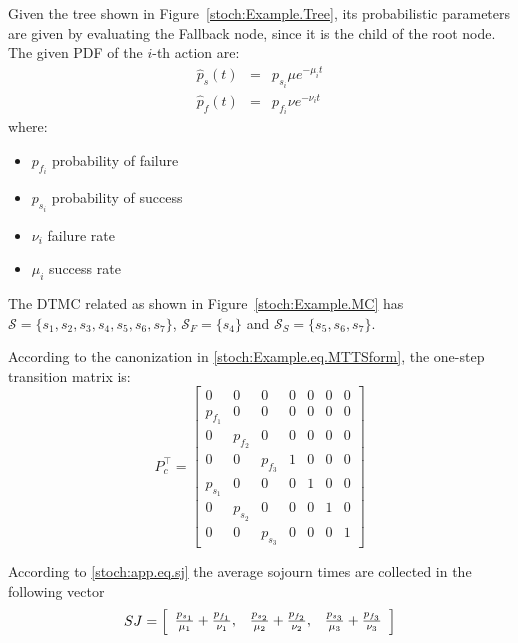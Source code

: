 \begin{example}
Given the tree shown in Figure~\ref{stoch:Example.Tree}, its probabilistic parameters are given by evaluating the Fallback node, since it is the child of the root node. The given PDF of the $i$-th action are:
\begin{eqnarray}
 \hat p_s(t)&=& p_{s_i} \mu e^{-\mu_i t}\\
  \hat p_f(t)&=& p_{f_i} \nu e^{-\nu_i t}
\end{eqnarray}
where:
\begin{itemize}
\item $p_{f_i}$ probability of failure
\item $p_{s_i}$ probability of success
\item $\nu_i$ failure rate
\item $\mu_i$ success rate
\end{itemize}
The DTMC related as shown in Figure~\ref{stoch:Example.MC} has $\mathcal{S}=\{s_1,s_2,s_3,s_4,s_5,s_6,s_7\}$, $\mathcal{S}_F =\{s_4\}$ and $\mathcal{S}_S =\{s_5,s_6,s_7\}$. 
 
According to the canonization in \eqref{stoch:Example.eq.MTTSform}, the one-step transition matrix is:
\begin{equation}
\label{stoch:app.eq.MTTSform}
 P_c^\top=\left[
\begin{array}{ccccccc}
0 & 0 & 0 & 0 & 0 & 0 & 0 \\ 
p_{f_1} & 0 & 0 & 0 & 0 & 0 & 0 \\ 
0 & p_{f_2} & 0 & 0 & 0 & 0 & 0 \\ 
0 & 0 & p_{f_3} & 1 & 0 & 0 & 0 \\ 
p_{s_1} & 0 & 0 & 0 & 1 & 0 & 0 \\ 
0 & p_{s_2} & 0 & 0 & 0 & 1 & 0 \\ 
0 & 0 & p_{s_3} & 0 & 0 & 0 & 1
\end{array} \right]
\end{equation}

According to \eqref{stoch:app.eq.sj} the average sojourn times are collected in the following vector
\begin{equation}
\label{stoch:app.eq.exSj}
SJ =\left[\begin{array}{c c c}
\frac{p_{s_1}}{\mu_1}+\frac{p_{f_1}}{\nu_1},&\frac{p_{s_2}}{\mu_2}+\frac{p_{f_2}}{\nu_2},&\frac{p_{s_3}}{\mu_3}+\frac{p_{f_3}}{\nu_3} 
\end{array}\right]
\end{equation}


\end{example}

